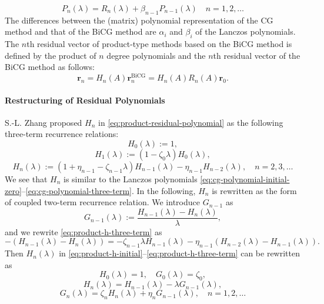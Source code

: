 \begin{equation}\label{eq:product-bicg-direction-polynomial}P_n(\lambda)=R_n(\lambda)+\beta_{n-1}P_{n-1}(\lambda)\quad n=1,2,\ldots\end{equation}
{The differences between the (matrix) polynomial representation of the CG method and that of the BiCG method are $\alpha_i$ and $\beta_i$ of the Lanczos polynomials. The $n$th residual vector of product-type methods based on the BiCG method is defined by the product of $n$ degree polynomials and the $n$th residual vector of the BiCG method as follows:}
\begin{equation}\label{eq:product-residual-polynomial}\bm r_n=H_n(A)\bm r_n^{\mathrm{BiCG}}=H_n(A)R_n(A)\bm r_0.\end{equation}
\paragraph{{Restructuring of Residual Polynomials}}\label{subsec:product-polynomial-restructuring}\mbox{}\par
{S.-L. Zhang proposed $H_n$ in \eqref{eq:product-residual-polynomial} as the following three-term recurrence relations:}
\begin{equation}\label{eq:product-h-initial}H_0(\lambda):=1,\end{equation}
\begin{equation}\label{eq:product-h-first}H_1(\lambda):=(1-\zeta_0\lambda)H_0(\lambda),\end{equation}
\begin{equation}\label{eq:product-h-three-term}H_n(\lambda):=(1+\eta_{n-1}-\zeta_{n-1}\lambda)H_{n-1}(\lambda)-\eta_{n-1}H_{n-2}(\lambda),\quad n=2,3,\ldots\end{equation}
{We see that $H_n$ is similar to the Lanczos polynomials \eqref{eq:cg-polynomial-initial-zero}--\eqref{eq:cg-polynomial-three-term}.}
{In the following, $H_n$ is rewritten as the form of coupled two-term recurrence relation. We introduce $G_{n-1}$ as}
\[G_{n-1}(\lambda):=\frac{H_{n-1}(\lambda)-H_n(\lambda)}{\lambda},\]
{and we rewrite \eqref{eq:product-h-three-term} as}
\[-(H_{n-1}(\lambda)-H_n(\lambda))=-\zeta_{n-1}\lambda H_{n-1}(\lambda)-\eta_{n-1}(H_{n-2}(\lambda)-H_{n-1}(\lambda)).\]
{Then $H_n(\lambda)$ in \eqref{eq:product-h-initial}--\eqref{eq:product-h-three-term} can be rewritten as}
\begin{equation}\label{eq:product-coupled-initial}H_0(\lambda)=1,\quad G_0(\lambda)=\zeta_0,\end{equation}
\begin{equation}\label{eq:product-coupled-h}H_n(\lambda)=H_{n-1}(\lambda)-\lambda G_{n-1}(\lambda),\end{equation}
\begin{equation}\label{eq:product-coupled-g}G_n(\lambda)=\zeta_nH_n(\lambda)+\eta_nG_{n-1}(\lambda),\quad n=1,2,\ldots\end{equation}
